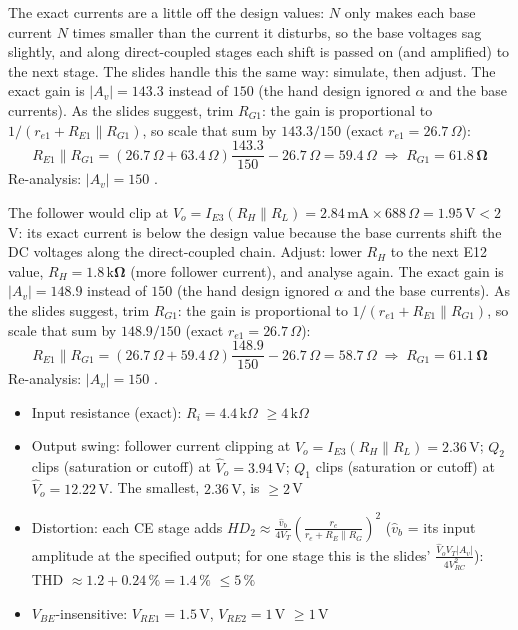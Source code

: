 \documentclass[11pt]{article}
\begin{document}
The exact currents are a little off the design values: $N$ only makes each base current $N$ times smaller than the current it disturbs, so the base voltages sag slightly, and along direct-coupled stages each shift is passed on (and amplified) to the next stage. The slides handle this the same way: simulate, then adjust. The exact gain is $|A_v| = 143.3$ instead of $150$ (the hand design ignored $\alpha$ and the base currents). As the slides suggest, trim $R_{G1}$: the gain is proportional to $1/(r_{e1} + R_{E1}\|R_{G1})$, so scale that sum by $143.3/150$ (exact $r_{e1} = 26.7\,\Omega$):\[R_{E1}\|R_{G1} = (26.7\,\Omega + 63.4\,\Omega)\frac{143.3}{150} - 26.7\,\Omega = 59.4\,\Omega \;\Rightarrow\; R_{G1} = \mathbf{61.8\,\Omega}\]Re-analysis: $|A_v| = 150$ \checkmark. \par The follower would clip at $\hat V_o = I_{E3}(R_H\|R_L) = 2.84\,\mathrm{m}\mathrm{A}\times688\,\Omega = 1.95\,\mathrm{V} < 2$\,V: its exact current is below the design value because the base currents shift the DC voltages along the direct-coupled chain. Adjust: lower $R_H$ to the next E12 value, $R_H = \mathbf{1.8\,\mathrm{k}\Omega}$ (more follower current), and analyse again. The exact gain is $|A_v| = 148.9$ instead of $150$ (the hand design ignored $\alpha$ and the base currents). As the slides suggest, trim $R_{G1}$: the gain is proportional to $1/(r_{e1} + R_{E1}\|R_{G1})$, so scale that sum by $148.9/150$ (exact $r_{e1} = 26.7\,\Omega$):\[R_{E1}\|R_{G1} = (26.7\,\Omega + 59.4\,\Omega)\frac{148.9}{150} - 26.7\,\Omega = 58.7\,\Omega \;\Rightarrow\; R_{G1} = \mathbf{61.1\,\Omega}\]Re-analysis: $|A_v| = 150$ \checkmark. \begin{itemize}[leftmargin=*,itemsep=2pt]
\item Input resistance (exact): $R_i = 4.4\,\mathrm{k}\Omega$ $\ge 4\,\mathrm{k}\Omega$ \checkmark
\item Output swing: follower current clipping at $\hat V_o = I_{E3}(R_H\|R_L) = 2.36\,\mathrm{V}$; $Q_{2}$ clips (saturation or cutoff) at $\hat V_o = 3.94\,\mathrm{V}$; $Q_{1}$ clips (saturation or cutoff) at $\hat V_o = 12.22\,\mathrm{V}$. The smallest, $2.36\,\mathrm{V}$, is $\ge 2$\,V \checkmark
\item Distortion: each CE stage adds $HD_2 \approx \frac{\hat v_b}{4V_T}\left(\frac{r_e}{r_e + R_E\|R_G}\right)^2$ ($\hat v_b$ = its input amplitude at the specified output; for one stage this is the slides' $\frac{\hat V_o V_T |A_v|}{4V_{RC}^2}$): THD $\approx 1.2 + 0.24\,\% = 1.4\,\%$ $\le 5\,\%$ \checkmark
\item $V_{BE}$-insensitive: $V_{RE1} = 1.5$\,V, $V_{RE2} = 1$\,V $\ge 1$\,V \checkmark
\end{itemize}
\end{document}
